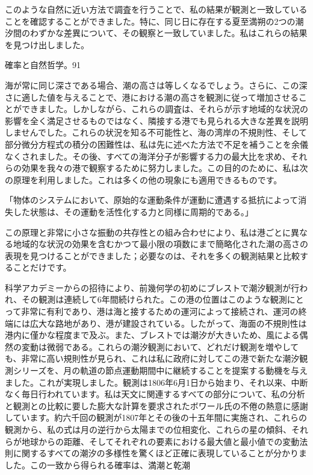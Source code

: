 \documentclass[a4paper,11pt,openany]{ltjsbook}
\begin{document}
このような自然に近い方法で調査を行うことで、私の結果が観測と一致していることを確認することができました。特に、同じ日に存在する夏至満朔の2つの潮汐間のわずかな差異について、その観察と一致していました。私はこれらの結果を見つけ出しました。

確率と自然哲学。91

海が常に同じ深さである場合、潮の高さは等しくなるでしょう。さらに、この深さに適した値を与えることで、港における潮の高さを観測に従って増加させることができました。しかしながら、これらの調査は、それらが示す地域的な状況の影響を全く満足させるものではなく、隣接する港でも見られる大きな差異を説明しませんでした。これらの状況を知る不可能性と、海の湾岸の不規則性、そして部分微分方程式の積分の困難性は、私は先に述べた方法で不足を補うことを余儀なくされました。その後、すべての海洋分子が影響する力の最大比を求め、それらの効果を我々の港で観察するために努力しました。この目的のために、私は次の原理を利用しました。これは多くの他の現象にも適用できるものです。

「物体のシステムにおいて、原始的な運動条件が運動に遭遇する抵抗によって消失した状態は、その運動を活性化する力と同様に周期的である。」

この原理と非常に小さな振動の共存性との組み合わせにより、私は港ごとに異なる地域的な状況の効果を含むかつて最小限の項数にまで簡略化された潮の高さの表現を見つけることができました；必要なのは、それを多くの観測結果と比較することだけです。

科学アカデミーからの招待により、前幾何学の初めにブレストで潮汐観測が行われ、その観測は連続して6年間続けられた。この港の位置はこのような観測にとって非常に有利であり、港は海と接するための運河によって接続され、運河の終端には広大な路地があり、港が建設されている。したがって、海面の不規則性は港内に僅かな程度まで及ぶ。また、ブレストでは潮汐が大きいため、風による偶然の変動は微弱である。これらの潮汐観測において、どれだけ観測を増やしても、非常に高い規則性が見られ、これは私に政府に対してこの港で新たな潮汐観測シリーズを、月の軌道の節点運動期間中に継続することを提案する動機を与えました。これが実現しました。観測は1806年6月1日から始まり、それ以来、中断なく毎日行われています。私は天文に関連するすべての部分について、私の分析と観測との比較に要した膨大な計算を要求されたボワール氏の不倦の熱意に感謝しています。約六千回の観測が1807年とその後の十五年間に実施され、これらの観測から、私の式は月の逆行から太陽までの位相変化、これらの星の傾斜、それらが地球からの距離、そしてそれぞれの要素における最大値と最小値での変動法則に関するすべての潮汐の多様性を驚くほど正確に表現していることが分かりました。この一致から得られる確率は、満潮と乾潮
\end{document}
